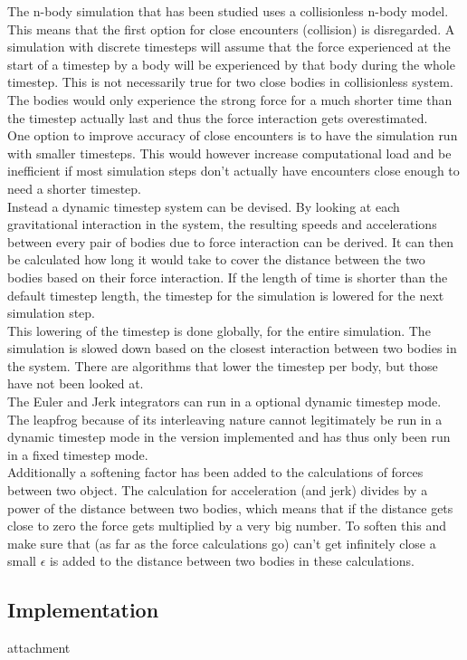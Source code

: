 \documentclass[11pt]{article} %
\begin{document}
The n-body simulation that has been studied uses a collisionless n-body model. This means that the first option for close encounters (collision) is disregarded. A simulation with discrete timesteps will assume that the force experienced at the start of a timestep by a body will be experienced by that body during the whole timestep. This is not necessarily true for two close bodies in collisionless system. The bodies would only experience the strong force for a much shorter time than the timestep actually last and thus the force interaction gets overestimated. \\
One option to improve accuracy of close encounters is to have the simulation run with smaller timesteps. This would however increase computational load and be inefficient if most simulation steps don't actually have encounters close enough to need a shorter timestep.\\
Instead a dynamic timestep system can be devised. By looking at each gravitational interaction in the system, the resulting speeds and accelerations between every pair of bodies due to force interaction can be derived. It can then be calculated how long it would take to cover the distance between the two bodies based on their force interaction. If the length of time is shorter than the default timestep length, the timestep for the simulation is lowered for the next simulation step.\\ 
This lowering of the timestep is done globally, for the entire simulation. The simulation is slowed down based on the closest interaction between two bodies in the system. There are algorithms that lower the timestep per body, but those have not been looked at.\\
The Euler and Jerk integrators can run in a optional dynamic timestep mode. The leapfrog because of its interleaving nature cannot legitimately be run in a dynamic timestep mode in the version implemented and has thus only been run in a fixed timestep mode.\\
Additionally a softening factor has been added to the calculations of forces between two object. The calculation for acceleration (and jerk) divides by a power of the distance between two bodies, which means that if the distance gets close to zero the force gets multiplied by a very big number. To soften this and make sure that (as far as the force calculations go) can't get infinitely close a small $\epsilon$ is added to the distance between two bodies in these calculations.
\subsection{Implementation}
attachment
\end{document}

